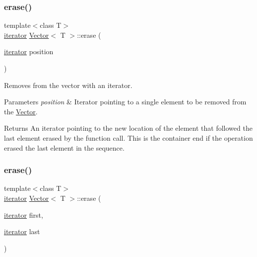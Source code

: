 \subsubsection{\texorpdfstring{erase()}{erase()}\hspace{0.1cm}{\footnotesize\ttfamily [2/6]}}
{\footnotesize\ttfamily template$<$class T$>$ \\
\hyperlink{classVector_a45531016f99e90887e0f890f2da943e4}{iterator} \hyperlink{classVector}{Vector}$<$ T $>$\+::erase (\begin{DoxyParamCaption}\item[{\hyperlink{classVector_a45531016f99e90887e0f890f2da943e4}{iterator}}]{position }\end{DoxyParamCaption})\hspace{0.3cm}{\ttfamily [inline]}}



Removes from the vector with an iterator. 


\begin{DoxyParams}{Parameters}
{\em position} & Iterator pointing to a single element to be removed from the \hyperlink{classVector}{Vector}. \\
\hline
\end{DoxyParams}
\begin{DoxyReturn}{Returns}
An iterator pointing to the new location of the element that followed the last element erased by the function call. This is the container end if the operation erased the last element in the sequence. 
\end{DoxyReturn}
\mbox{\label{classVector_afd90059f9dff48f4417b51f6eae8e152}} 
\subsubsection{\texorpdfstring{erase()}{erase()}\hspace{0.1cm}{\footnotesize\ttfamily [3/6]}}
{\footnotesize\ttfamily template$<$class T$>$ \\
\hyperlink{classVector_a45531016f99e90887e0f890f2da943e4}{iterator} \hyperlink{classVector}{Vector}$<$ T $>$\+::erase (\begin{DoxyParamCaption}\item[{\hyperlink{classVector_a45531016f99e90887e0f890f2da943e4}{iterator}}]{first,  }\item[{\hyperlink{classVector_a45531016f99e90887e0f890f2da943e4}{iterator}}]{last }\end{DoxyParamCaption})\hspace{0.3cm}{\ttfamily [inline]}}



